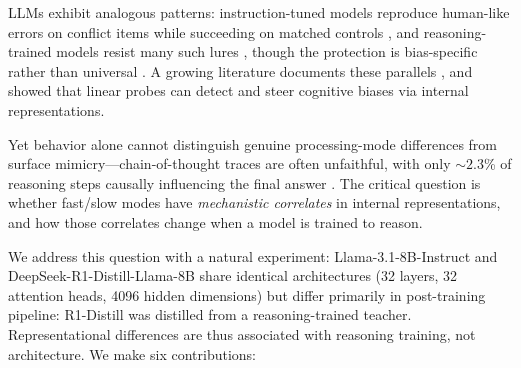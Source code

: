 \documentclass[twocolumn,10pt]{article}
\begin{document}
LLMs exhibit analogous patterns: instruction-tuned models reproduce
human-like errors on conflict items while succeeding on matched controls
\citep{hagendorff2023human}, and reasoning-trained models resist many
such lures \citep{deepseekr1}, though the protection is bias-specific
rather than universal \citep{schwartz2025clinical}.  A growing literature
documents these parallels \citep{codaforno2025dual,
ziabari2025reasoning}, and \citet{huang2026cogbias} showed that linear
probes can detect and steer cognitive biases via internal representations.

Yet behavior alone cannot distinguish genuine processing-mode differences
from surface mimicry---chain-of-thought traces are often unfaithful,
with only ${\sim}2.3$\% of reasoning steps causally influencing the
final answer \citep{jiang2025aha, lanham2023measuring,
boppana2026reasoning}.  The critical question is whether fast/slow modes
have \emph{mechanistic correlates} in internal representations, and how
those correlates change when a model is trained to reason.

We address this question with a natural experiment: Llama-3.1-8B-Instruct
and DeepSeek-R1-Distill-Llama-8B share identical architectures (32
layers, 32 attention heads, 4096 hidden dimensions) but differ
primarily in post-training pipeline: R1-Distill was distilled from a
reasoning-trained teacher.  Representational differences are thus
associated with reasoning training, not architecture.  We make six contributions:
\end{document}
